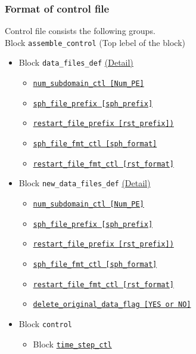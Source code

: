 \subsubsection{Format of control file}
Control file consists the following groups. \\
%
Block \verb|assemble_control| \label{href_i:assemble_control} (Top lebel of the block)
\begin{itemize}
\item Block \verb|data_files_def|
	\hyperref[href_t:data_files_def]{(Detail)}
	\begin{itemize}
	\item \hyperref[href_t:num_subdomain_ctl]
			{\tt num\_subdomain\_ctl    [Num\_PE]}
	\item \hyperref[href_t:sph_file_prefix]
			{\tt sph\_file\_prefix      [sph\_prefix]}
	\item \hyperref[href_t:restart_file_prefix]
            {\tt restart\_file\_prefix  [rst\_prefix])}
%
	\item \hyperref[href_t:sph_file_fmt_ctl]
			{\tt sph\_file\_fmt\_ctl    [sph\_format]}
	\item \hyperref[href_t:restart_file_fmt_ctl]
			{\tt restart\_file\_fmt\_ctl    [rst\_format]}
	\end{itemize}
%
\item Block \verb|new_data_files_def|
	\label{href_i:new_data_files_def}
	\hyperref[href_t:new_data_files_def]{(Detail)}
	\begin{itemize}
	\item \hyperref[href_t:num_subdomain_ctl]
			{\tt num\_subdomain\_ctl    [Num\_PE]}
	\item \hyperref[href_t:sph_file_prefix]
			{\tt sph\_file\_prefix      [sph\_prefix]}
	\item \hyperref[href_t:restart_file_prefix]
            {\tt restart\_file\_prefix  [rst\_prefix])}
%
	\item \hyperref[href_t:sph_file_fmt_ctl]
			{\tt sph\_file\_fmt\_ctl    [sph\_format]}
	\item \hyperref[href_t:restart_file_fmt_ctl]
			{\tt restart\_file\_fmt\_ctl    [rst\_format]}
%
	\item \hyperref[href_t:delete_original_data_flag]
			{\tt delete\_original\_data\_flag    [YES or NO]}
	\end{itemize}
%
\item Block \verb|control|
	\begin{itemize}
	\item Block \hyperref[href_t:time_step_ctl]{\tt time\_step\_ctl}

\end{itemize}
\end{itemize}

